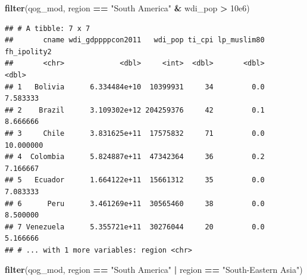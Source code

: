 \documentclass[]{book}
\newenvironment{Shaded}{\begin{snugshade}}{\end{snugshade}}
\newcommand{\KeywordTok}[1]{\textcolor[rgb]{0.13,0.29,0.53}{\textbf{#1}}}
\newcommand{\FloatTok}[1]{\textcolor[rgb]{0.00,0.00,0.81}{#1}}
\newcommand{\StringTok}[1]{\textcolor[rgb]{0.31,0.60,0.02}{#1}}
\newcommand{\OperatorTok}[1]{\textcolor[rgb]{0.81,0.36,0.00}{\textbf{#1}}}
\newcommand{\NormalTok}[1]{#1}
\begin{document}
\begin{Shaded}
\begin{Highlighting}[]
\KeywordTok{filter}\NormalTok{(qog_mod, region }\OperatorTok{==}\StringTok{ "South America"} \OperatorTok{&}\StringTok{ }\NormalTok{wdi_pop }\OperatorTok{>}\StringTok{ }\FloatTok{10e6}\NormalTok{)}
\end{Highlighting}
\end{Shaded}

\begin{verbatim}
## # A tibble: 7 x 7
##       cname wdi_gdppppcon2011   wdi_pop ti_cpi lp_muslim80 fh_ipolity2
##       <chr>             <dbl>     <int>  <dbl>       <dbl>       <dbl>
## 1   Bolivia      6.334484e+10  10399931     34         0.0    7.583333
## 2    Brazil      3.109302e+12 204259376     42         0.1    8.666666
## 3     Chile      3.831625e+11  17575832     71         0.0   10.000000
## 4  Colombia      5.824887e+11  47342364     36         0.2    7.166667
## 5   Ecuador      1.664122e+11  15661312     35         0.0    7.083333
## 6      Peru      3.461269e+11  30565460     38         0.0    8.500000
## 7 Venezuela      5.355721e+11  30276044     20         0.0    5.166666
## # ... with 1 more variables: region <chr>
\end{verbatim}

\begin{Shaded}
\begin{Highlighting}[]
\KeywordTok{filter}\NormalTok{(qog_mod, region }\OperatorTok{==}\StringTok{ "South America"} \OperatorTok{|}\StringTok{ }\NormalTok{region }\OperatorTok{==}\StringTok{ "South-Eastern Asia"}\NormalTok{)}
\end{Highlighting}
\end{Shaded}
\end{document}
